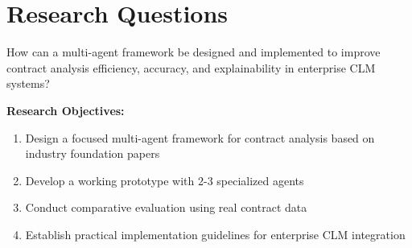
\section{Research Questions}\label{section:research_questions}

How can a multi-agent framework be designed and implemented to improve contract analysis efficiency, accuracy, and explainability in enterprise CLM systems?
\newline
\break

\textbf{Research Objectives:}
\begin{enumerate}
    \item Design a focused multi-agent framework for contract analysis based on industry foundation papers
    \item Develop a working prototype with 2-3 specialized agents
    \item Conduct comparative evaluation using real contract data
    \item Establish practical implementation guidelines for enterprise CLM integration
\end{enumerate}

\break
